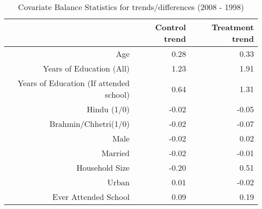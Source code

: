 \begin{table}[ht]
\centering
\begin{tabular}{rrr}
  \toprule
 & Control trend & Treatment trend \\ 
  \midrule
Age & 0.28 & 0.33 \\ 
  Years of Education (All) & 1.23 & 1.91 \\ 
  Years of Education (If attended school) & 0.64 & 1.31 \\ 
  Hindu (1/0) & -0.02 & -0.05 \\ 
  Brahmin/Chhetri(1/0) & -0.02 & -0.07 \\ 
  Male & -0.02 & 0.02 \\ 
  Married & -0.02 & -0.01 \\ 
  Household Size & -0.20 & 0.51 \\ 
  Urban & 0.01 & -0.02 \\ 
  Ever Attended School & 0.09 & 0.19 \\ 
   \bottomrule
\end{tabular}
\caption{Covariate Balance Statistics for trends/differences (2008 - 1998)} 
\end{table}
